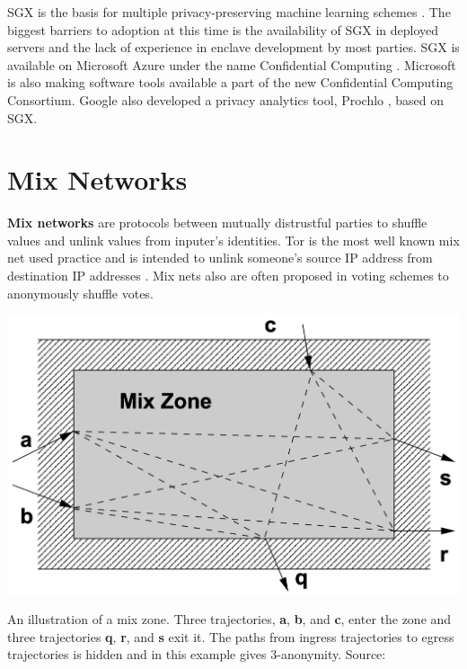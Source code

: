 \documentclass[nobib]{tufte-handout}
\begin{document}
SGX is the basis for multiple privacy-preserving machine learning schemes
\cite{DBLP:conf/eurosp/ChengZKHHJJ0S19,tramer2018slalom,DBLP:journals/corr/abs-1803-05961}.
The biggest barriers to adoption at this time is the availability of SGX in
deployed servers and the lack of experience in enclave development by most
parties. SGX is available on Microsoft Azure under the name Confidential
Computing \cite{azure-confidential-computing}.  Microsoft is also making
software tools available a part of the new Confidential Computing Consortium.
Google also developed a privacy analytics tool, Prochlo \cite{prochlo}, based on
SGX.

\section{Mix Networks}

\textbf{Mix networks} \cite{DBLP:journals/cacm/Chaum81} are protocols between
mutually distrustful parties to shuffle values and unlink values from inputer’s
identities. Tor is the most well known mix net used practice and is intended to
unlink someone's source IP address from destination IP addresses
\cite{DBLP:conf/uss/DingledineMS04}. Mix nets also are often proposed in voting
schemes to anonymously shuffle votes.


\begin{marginfigure} \includegraphics[width=\linewidth]{mixzone} \caption{
An illustration of a mix zone. Three trajectories, \textbf{a}, \textbf{b}, and
\textbf{c}, enter the zone and three trajectories \textbf{q}, \textbf{r}, and
\textbf{s} exit it. The paths from ingress trajectories to egress
trajectories is hidden and in this example gives 3-anonymity.
Source: \cite{freudiger2007mix}}
\label{fig:mixzone} \end{marginfigure}
\end{document}
